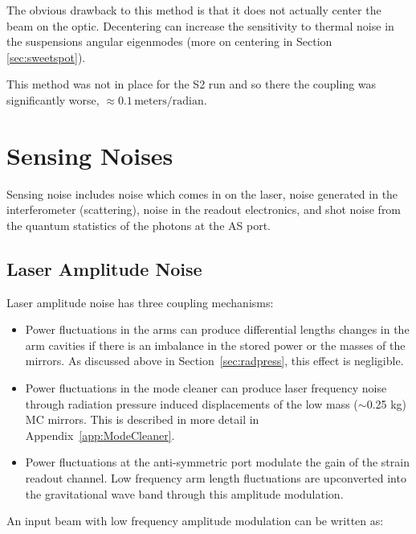 The obvious drawback to this method is that it does not actually center the
beam on the optic. Decentering can increase the sensitivity to thermal noise
in the suspensions angular eigenmodes (more on centering in Section \ref{sec:sweetspot}).

This method was not in place for the S2 run and so there the coupling was significantly
worse, $\approx0.1 \, \mbox{meters}/\mbox{radian}$.




\section{Sensing Noises}

Sensing noise includes noise which comes in on the laser, noise generated in the
interferometer (scattering), noise in the readout electronics, and shot noise from
the quantum statistics of the photons at the AS port. 


\subsection{Laser Amplitude Noise}
\label{sec:IntensityNoise}

Laser amplitude noise has three coupling mechanisms:

\begin{itemize}
\item Power fluctuations in the arms can produce differential lengths changes
      in the arm cavities if there is an imbalance in the stored power or
      the masses of the mirrors. As discussed above in 
      Section~\ref{sec:radpress}, this effect is negligible.

\item Power fluctuations in the mode cleaner can produce laser frequency
      noise through radiation pressure induced displacements of the low mass
      ($\sim$0.25 kg) MC mirrors. This is described in more detail in
      Appendix~\ref{app:ModeCleaner}.

\item Power fluctuations at the anti-symmetric port modulate the gain of
      the strain readout channel. Low frequency arm length fluctuations
      are upconverted into the gravitational wave band through this 
      amplitude modulation.
\end{itemize}
An input beam with low frequency amplitude modulation can be written as:

